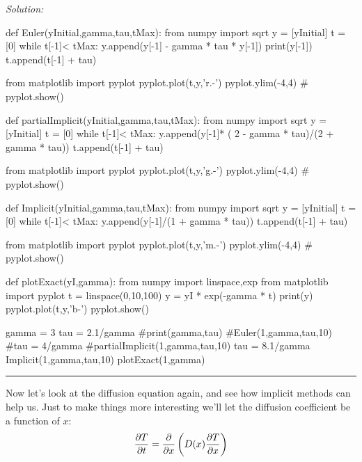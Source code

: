 \ifsolutions
\textit{Solution:}\\
\begin{codeexample}
\begin{VerbatimOut}{\listingFile}

def Euler(yInitial,gamma,tau,tMax):
    from numpy import sqrt
    y = [yInitial]
    t = [0]
    while t[-1]< tMax:
        y.append(y[-1] - gamma * tau * y[-1])
        print(y[-1])
        t.append(t[-1] + tau)
        
    from matplotlib import pyplot
    pyplot.plot(t,y,'r.-')
    pyplot.ylim(-4,4)
    #    pyplot.show()

def partialImplicit(yInitial,gamma,tau,tMax):
    from numpy import sqrt
    y = [yInitial]
    t = [0]
    while t[-1]< tMax:
        y.append(y[-1]* ( 2 - gamma * tau)/(2 + gamma * tau))
        t.append(t[-1] + tau)
        
    from matplotlib import pyplot
    pyplot.plot(t,y,'g.-')
    pyplot.ylim(-4,4)
    #    pyplot.show()

def Implicit(yInitial,gamma,tau,tMax):
    from numpy import sqrt
    y = [yInitial]
    t = [0]
    while t[-1]< tMax:
        y.append(y[-1]/(1 + gamma * tau))
        t.append(t[-1] + tau)
        
    from matplotlib import pyplot
    pyplot.plot(t,y,'m.-')
    pyplot.ylim(-4,4)
    #    pyplot.show()

def plotExact(yI,gamma):
    from numpy import linspace,exp
    from matplotlib import pyplot
    t = linspace(0,10,100)
    y = yI * exp(-gamma * t)
    print(y)
    pyplot.plot(t,y,'b-')
    pyplot.show()



gamma = 3
tau = 2.1/gamma
#print(gamma,tau)
#Euler(1,gamma,tau,10)
#tau = 4/gamma
#partialImplicit(1,gamma,tau,10)
tau = 8.1/gamma
Implicit(1,gamma,tau,10)
plotExact(1,gamma)
\end{VerbatimOut}
\end{codeexample}
\else
\noindent\rule{5 in}{0.01 in}
\fi


Now let's look at the diffusion equation again, and see how
implicit methods can help us.  Just to make things more
interesting we'll let the diffusion coefficient be a function
of $x$:
\begin{equation}\label{D(x)}
    {\partial T \over \partial t} = {\partial \over \partial x}
    \left( D(x) {\partial T \over \partial x} \right)
\end{equation}
 
